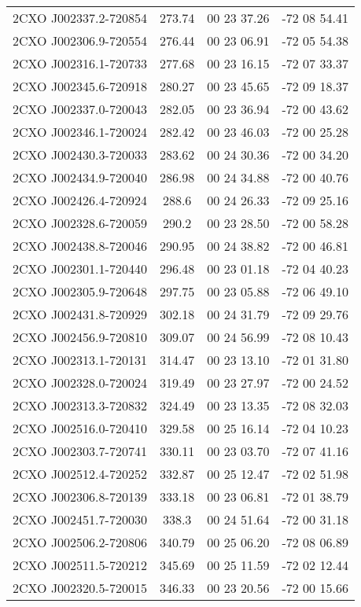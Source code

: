 \begin{table}
\begin{tabular}{cccc}
2CXO J002337.2-720854 & 273.74 & 00 23 37.26 & -72 08 54.41 \\
2CXO J002306.9-720554 & 276.44 & 00 23 06.91 & -72 05 54.38 \\
2CXO J002316.1-720733 & 277.68 & 00 23 16.15 & -72 07 33.37 \\
2CXO J002345.6-720918 & 280.27 & 00 23 45.65 & -72 09 18.37 \\
2CXO J002337.0-720043 & 282.05 & 00 23 36.94 & -72 00 43.62 \\
2CXO J002346.1-720024 & 282.42 & 00 23 46.03 & -72 00 25.28 \\
2CXO J002430.3-720033 & 283.62 & 00 24 30.36 & -72 00 34.20 \\
2CXO J002434.9-720040 & 286.98 & 00 24 34.88 & -72 00 40.76 \\
2CXO J002426.4-720924 & 288.6 & 00 24 26.33 & -72 09 25.16 \\
2CXO J002328.6-720059 & 290.2 & 00 23 28.50 & -72 00 58.28 \\
2CXO J002438.8-720046 & 290.95 & 00 24 38.82 & -72 00 46.81 \\
2CXO J002301.1-720440 & 296.48 & 00 23 01.18 & -72 04 40.23 \\
2CXO J002305.9-720648 & 297.75 & 00 23 05.88 & -72 06 49.10 \\
2CXO J002431.8-720929 & 302.18 & 00 24 31.79 & -72 09 29.76 \\
2CXO J002456.9-720810 & 309.07 & 00 24 56.99 & -72 08 10.43 \\
2CXO J002313.1-720131 & 314.47 & 00 23 13.10 & -72 01 31.80 \\
2CXO J002328.0-720024 & 319.49 & 00 23 27.97 & -72 00 24.52 \\
2CXO J002313.3-720832 & 324.49 & 00 23 13.35 & -72 08 32.03 \\
2CXO J002516.0-720410 & 329.58 & 00 25 16.14 & -72 04 10.23 \\
2CXO J002303.7-720741 & 330.11 & 00 23 03.70 & -72 07 41.16 \\
2CXO J002512.4-720252 & 332.87 & 00 25 12.47 & -72 02 51.98 \\
2CXO J002306.8-720139 & 333.18 & 00 23 06.81 & -72 01 38.79 \\
2CXO J002451.7-720030 & 338.3 & 00 24 51.64 & -72 00 31.18 \\
2CXO J002506.2-720806 & 340.79 & 00 25 06.20 & -72 08 06.89 \\
2CXO J002511.5-720212 & 345.69 & 00 25 11.59 & -72 02 12.44 \\
2CXO J002320.5-720015 & 346.33 & 00 23 20.56 & -72 00 15.66 \\

\end{tabular}
\end{table}
